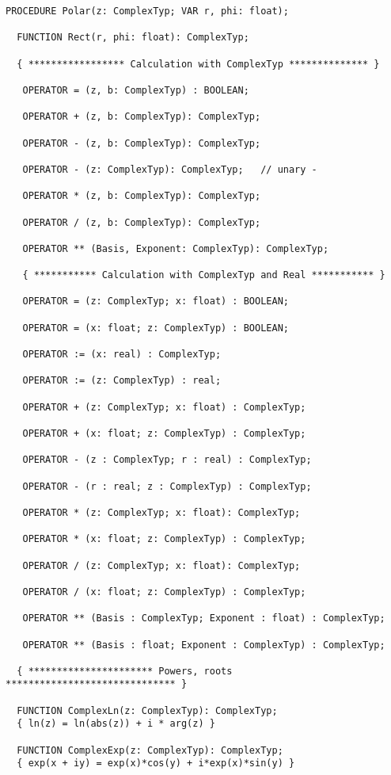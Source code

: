 \begin{refsection}
\begin{lstlisting}[caption=Interface of \texttt{Complex}]
  PROCEDURE Polar(z: ComplexTyp; VAR r, phi: float);

  FUNCTION Rect(r, phi: float): ComplexTyp;

  { ***************** Calculation with ComplexTyp ************** }

   OPERATOR = (z, b: ComplexTyp) : BOOLEAN;

   OPERATOR + (z, b: ComplexTyp): ComplexTyp;

   OPERATOR - (z, b: ComplexTyp): ComplexTyp;

   OPERATOR - (z: ComplexTyp): ComplexTyp;   // unary -

   OPERATOR * (z, b: ComplexTyp): ComplexTyp;

   OPERATOR / (z, b: ComplexTyp): ComplexTyp;

   OPERATOR ** (Basis, Exponent: ComplexTyp): ComplexTyp;

   { *********** Calculation with ComplexTyp and Real *********** }

   OPERATOR = (z: ComplexTyp; x: float) : BOOLEAN;

   OPERATOR = (x: float; z: ComplexTyp) : BOOLEAN;

   OPERATOR := (x: real) : ComplexTyp;

   OPERATOR := (z: ComplexTyp) : real;

   OPERATOR + (z: ComplexTyp; x: float) : ComplexTyp;

   OPERATOR + (x: float; z: ComplexTyp) : ComplexTyp;

   OPERATOR - (z : ComplexTyp; r : real) : ComplexTyp;

   OPERATOR - (r : real; z : ComplexTyp) : ComplexTyp;

   OPERATOR * (z: ComplexTyp; x: float): ComplexTyp;

   OPERATOR * (x: float; z: ComplexTyp) : ComplexTyp;

   OPERATOR / (z: ComplexTyp; x: float): ComplexTyp;

   OPERATOR / (x: float; z: ComplexTyp) : ComplexTyp;

   OPERATOR ** (Basis : ComplexTyp; Exponent : float) : ComplexTyp;

   OPERATOR ** (Basis : float; Exponent : ComplexTyp) : ComplexTyp;

  { ********************** Powers, roots ****************************** }

  FUNCTION ComplexLn(z: ComplexTyp): ComplexTyp;
  { ln(z) = ln(abs(z)) + i * arg(z) }

  FUNCTION ComplexExp(z: ComplexTyp): ComplexTyp;
  { exp(x + iy) = exp(x)*cos(y) + i*exp(x)*sin(y) }


\end{lstlisting}
\end{refsection}
